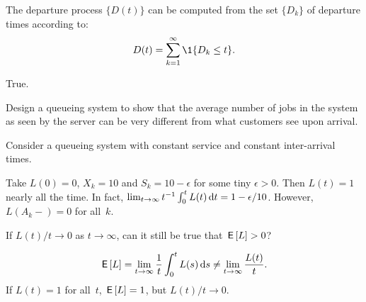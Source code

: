 \documentclass[stochastic-or.tex]{subfiles}
\begin{document}
\begin{truefalse}
The departure process $\{D(t)\}$ can be computed from the set $\{D_k\}$ of departure times according to:
\begin{equation*}
 D(t) = \sum_{k=1}^\infty \1{D_k \leq t}.
\end{equation*}

\begin{solution}
True.
\end{solution}
\end{truefalse}


\begin{exercise}\label{ex:l-165}
Design a queueing system to show that the average number of jobs in the system as seen by the server can be very different from what customers see upon arrival.
\begin{hint}
Consider a queueing system with constant service and constant inter-arrival times.
\end{hint}
\begin{solution}
 Take $L(0) = 0$, $X_k = 10$ and $S_k = 10-\epsilon$ for some tiny
 $\epsilon>0$. Then $L(t) = 1$ nearly all the time. In fact,
 $\lim_{t\to\infty}t^{-1}\int_0^t L(t) \,\textrm{d}t= 1-\epsilon/10$. However, $L(A_k-)=0$ for all~$k$.
\end{solution}
\end{exercise}


\begin{exercise}\label{ex:90}
 If $L(t)/t \to 0$ as $t\to\infty$, can it still be true that $\,\mathsf{E}\left[L\right]>0$?
\begin{solution}
 \begin{equation*}
 \,\mathsf{E}\left[L\right] = \lim_{t\to\infty} \frac 1 t \int_0^t L(s) \,\textrm{d}s \neq \lim_{t\to\infty} \frac{L(t)}t.
 \end{equation*}
If $L(t)=1$ for all~$t$, $\,\mathsf{E}\left[L\right] =1 $, but $L(t)/t \to 0$.
\end{solution}
\end{exercise}




\end{document}
